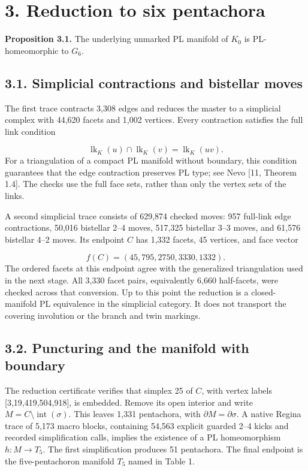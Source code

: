\documentclass[11pt,letterpaper]{article}
\begin{document}
\section*{3. Reduction to six pentachora}
\medskip\noindent\textbf{Proposition 3.1.} The underlying unmarked PL manifold of $K_0$ is PL-homeomorphic to $G_6$.

\subsection*{3.1. Simplicial contractions and bistellar moves}
The first trace contracts 3,308 edges and reduces the master to a simplicial complex with 44,620 facets and 1,002 vertices. Every contraction satisfies the full link condition

\[
\operatorname{lk}_{K}(u)\cap\operatorname{lk}_{K}(v)=\operatorname{lk}_{K}(uv).
\]
For a triangulation of a compact PL manifold without boundary, this condition guarantees that the edge contraction preserves PL type; see Nevo [11, Theorem 1.4]. The checks use the full face sets, rather than only the vertex sets of the links.

A second simplicial trace consists of 629,874 checked moves: 957 full-link edge contractions, 50,016 bistellar 2--4 moves, 517,325 bistellar 3--3 moves, and 61,576 bistellar 4--2 moves. Its endpoint $C$ has 1,332 facets, 45 vertices, and face vector

\[
f(C)=(45,795,2750,3330,1332).
\]
The ordered facets at this endpoint agree with the generalized triangulation used in the next stage. All 3,330 facet pairs, equivalently 6,660 half-facets, were checked across that conversion. Up to this point the reduction is a closed-manifold PL equivalence in the simplicial category. It does not transport the covering involution or the branch and twin markings.

\subsection*{3.2. Puncturing and the manifold with boundary}
The reduction certificate verifies that simplex 25 of $C$, with vertex labels [3,19,419,504,918], is embedded. Remove its open interior and write $M=C\setminus\operatorname{int}(\sigma)$. This leaves 1,331 pentachora, with $\partial M=\partial\sigma$. A native Regina trace of 5,173 macro blocks, containing 54,563 explicit guarded 2--4 kicks and recorded simplification calls, implies the existence of a PL homeomorphism $h:M\longrightarrow T_5$. The first simplification produces 51 pentachora. The final endpoint is the five-pentachoron manifold $T_5$ named in Table 1.
\end{document}
